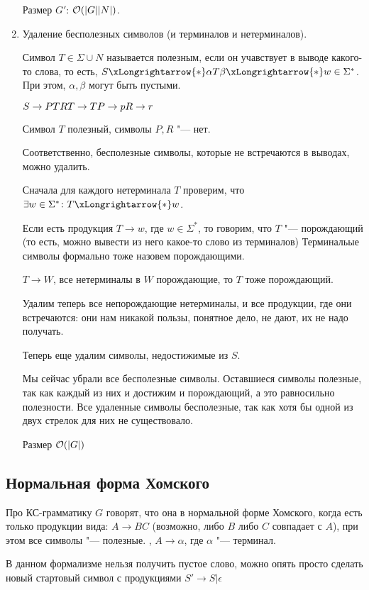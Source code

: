\begin{enumerate}
Размер $G'$: $\mathcal{O}(|G| |N|)$.

\item
Удаление бесполезных символов (и терминалов и нетерминалов).

Символ $T \in \Sigma \cup N$ называется полезным, если он учавствует в выводе какого-то слова, то есть, $S \xLongrightarrow{*} \alpha T \beta \xLongrightarrow{*} w \in \Sigma^*$. 
При этом, $\alpha, \beta$ могут быть пустыми.
\begin{exmp}
$S \to PTR \\
T \to T
P \to p
R \to r$

Символ $T$ полезный, символы $P, R$ "--- нет.
\end{exmp}
Соответственно, бесполезные символы, которые не встречаются в выводах, можно удалить.

Сначала для каждого нетерминала $T$ проверим, что $\exists w \in \Sigma^*\colon T \xLongrightarrow{*} w$.

Если есть продукция $T \to w$, где $w \in \Sigma^*$, то говорим, что $T$ "--- порождающий (то есть, можно вывести из него какое-то слово из терминалов)
Терминальые символы формально тоже назовем порождающими.

$T \to W$, все нетерминалы в $W$ порождающие, то $T$ тоже порождающий.                                              

Удалим теперь все непорождающие нетерминалы, и все продукции, где они встречаются: они нам никакой пользы, понятное дело, не дают, их не надо получать.

Теперь еще удалим символы, недостижимые из $S$.

Мы сейчас убрали все бесполезные символы. 
Оставшиеся символы полезные, так как каждый из них и достижим и порождающий, а это равносильно полезности.
Все удаленные символы бесполезные, так как хотя бы одной из двух стрелок для них не существовало.

Размер $\mathcal{O}(|G|)$
\end{enumerate}

\subsection{Нормальная форма Хомского}
\begin{Def}
Про КС-грамматику $G$ говорят, что она в нормальной форме Хомского, когда есть только продукции вида: $A \to BC$ (возможно, либо $B$ либо $C$ совпадает с $A$), при этом все символы "--- полезные.
, $A \to \alpha$, где $\alpha$ "--- терминал.
\end{Def}
\begin{Rem}
В данном формализме нельзя получить пустое слово, можно опять просто сделать новый стартовый символ с продукциями $S' \to S | \epsilon$
\end{Rem}                                                                                                                              

